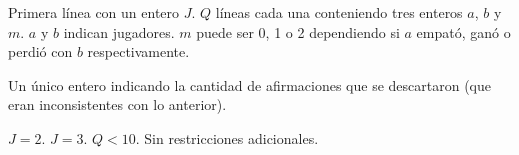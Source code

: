 \documentclass{oci}
\begin{document}
\begin{inputDescription}
  Primera línea con un entero $J$.
  $Q$ líneas cada una conteniendo tres enteros $a$, $b$ y $m$.
  $a$ y $b$ indican jugadores.
  $m$ puede ser 0, 1 o 2 dependiendo si $a$ empató, ganó o perdió con $b$ respectivamente.
\end{inputDescription}

\begin{outputDescription}
  Un único entero indicando la cantidad de afirmaciones que se descartaron (que
  eran inconsistentes con lo anterior).
\end{outputDescription}

\begin{scoreDescription}
   $J=2$.
   $J=3$.
   $Q<10$.
   Sin restricciones adicionales.
\end{scoreDescription}

\begin{sampleDescription}
\end{sampleDescription}
\end{document}
